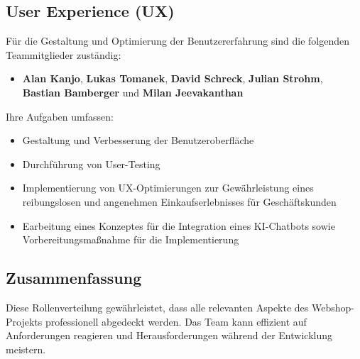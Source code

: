 \documentclass[%
	12pt,
	a4paper,
	oneside,
	parskip=full
]{scrbook}
\begin{document}
\subsection{User Experience (UX)}
Für die Gestaltung und Optimierung der Benutzererfahrung sind die folgenden Teammitglieder zuständig:
\begin{itemize}
	\item \textbf{Alan Kanjo}, \textbf{Lukas Tomanek}, \textbf{David Schreck}, \textbf{Julian Strohm}, \textbf{Bastian Bamberger} und \textbf{Milan Jeevakanthan}
\end{itemize}
Ihre Aufgaben umfassen:
\begin{itemize}
	\item Gestaltung und Verbesserung der Benutzeroberfläche
	\item Durchführung von User-Testing
	\item Implementierung von UX-Optimierungen zur Gewährleistung eines reibungslosen und angenehmen Einkaufserlebnisses für Geschäftskunden
	\item Earbeitung eines Konzeptes für die Integration eines KI-Chatbots sowie Vorbereitungsmaßnahme für die Implementierung
\end{itemize}

\subsection{Zusammenfassung}
Diese Rollenverteilung gewährleistet, dass alle relevanten Aspekte des Webshop-Projekts professionell abgedeckt werden. Das Team kann effizient auf Anforderungen reagieren und Herausforderungen während der Entwicklung meistern.
\end{document}
